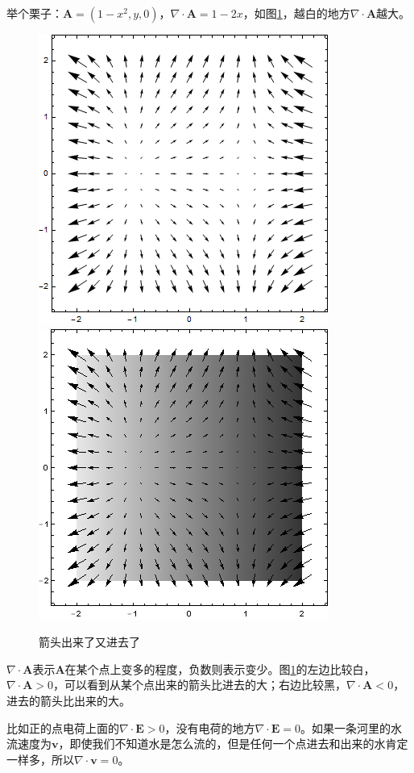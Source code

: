 举个栗子：$\mathbf{A}=(1-x^2,y,0)$，$\nabla \cdot \mathbf{A}=1-2x$，如图\ref{fig-vec-div}，越白的地方$\nabla \cdot \mathbf{A}$越大。
\begin{figure}[htb]
\centering
\includegraphics[scale=0.5]{fig/vec-div.png}
\includegraphics[scale=0.5]{fig/vec-div-2.png}
\caption{箭头出来了又进去了}
\label{fig-vec-div}
\end{figure}

$\nabla \cdot \mathbf{A}$表示$\mathbf{A}$在某个点上变多的程度，负数则表示变少。图\ref{fig-vec-div}的左边比较白，$\nabla \cdot \mathbf{A}>0$，可以看到从某个点出来的箭头比进去的大；右边比较黑，$\nabla \cdot \mathbf{A}<0$，进去的箭头比出来的大。

比如正的点电荷上面的$\nabla \cdot \mathbf{E}>0$，没有电荷的地方$\nabla \cdot \mathbf{E}=0$。如果一条河里的水流速度为$\mathbf{v}$，即使我们不知道水是怎么流的，但是任何一个点进去和出来的水肯定一样多，所以$\nabla \cdot \mathbf{v}=0$。

